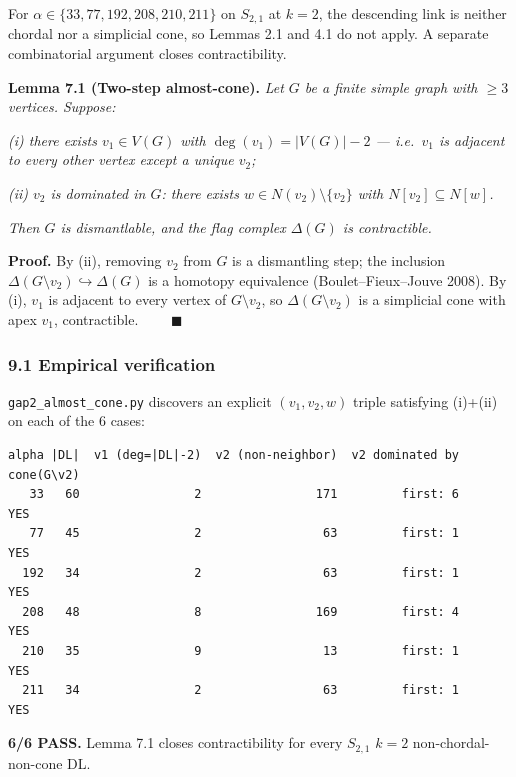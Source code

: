 \documentclass[
]{article}
\begin{document}
For \(\alpha \in \{33, 77, 192, 208, 210, 211\}\) on \(S_{2,1}\) at
\(k = 2\), the descending link is neither chordal nor a simplicial cone,
so Lemmas 2.1 and 4.1 do not apply. A separate combinatorial argument
closes contractibility.

\textbf{Lemma 7.1 (Two-step almost-cone).} \emph{Let \(G\) be a finite
simple graph with \(\ge 3\) vertices. Suppose:}

\emph{(i) there exists \(v_1 \in V(G)\) with \(\deg(v_1) = |V(G)| - 2\)
--- i.e.~\(v_1\) is adjacent to every other vertex except a unique
\(v_2\);}

\emph{(ii) \(v_2\) is dominated in \(G\): there exists
\(w \in N(v_2) \setminus \{v_2\}\) with \(N[v_2] \subseteq N[w]\).}

\emph{Then \(G\) is dismantlable, and the flag complex \(\Delta(G)\) is
contractible.}

\textbf{Proof.} By (ii), removing \(v_2\) from \(G\) is a dismantling
step; the inclusion
\(\Delta(G \setminus v_2) \hookrightarrow \Delta(G)\) is a homotopy
equivalence (Boulet--Fieux--Jouve 2008). By (i), \(v_1\) is adjacent to
every vertex of \(G \setminus v_2\), so \(\Delta(G \setminus v_2)\) is a
simplicial cone with apex \(v_1\), contractible. \(\qquad\blacksquare\)

\subsubsection{9.1 Empirical verification}\label{empirical-verification}

\texttt{gap2\_almost\_cone.py} discovers an explicit \((v_1, v_2, w)\)
triple satisfying (i)+(ii) on each of the 6 cases:

\begin{verbatim}
alpha |DL|  v1 (deg=|DL|-2)  v2 (non-neighbor)  v2 dominated by  cone(G\v2)
   33   60                2                171         first: 6        YES
   77   45                2                 63         first: 1        YES
  192   34                2                 63         first: 1        YES
  208   48                8                169         first: 4        YES
  210   35                9                 13         first: 1        YES
  211   34                2                 63         first: 1        YES
\end{verbatim}

\textbf{6/6 PASS.} Lemma 7.1 closes contractibility for every
\(S_{2,1}\) \(k = 2\) non-chordal-non-cone DL.
\end{document}
